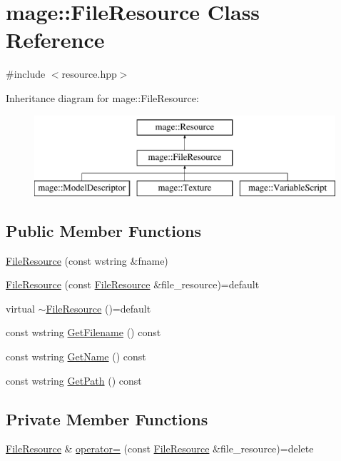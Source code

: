 \hypertarget{classmage_1_1_file_resource}{}\section{mage\+:\+:File\+Resource Class Reference}
\label{classmage_1_1_file_resource}


{\ttfamily \#include $<$resource.\+hpp$>$}

Inheritance diagram for mage\+:\+:File\+Resource\+:\begin{figure}[H]
\begin{center}
\leavevmode
\includegraphics[height=3.000000cm]{classmage_1_1_file_resource}
\end{center}
\end{figure}
\subsection*{Public Member Functions}
\begin{DoxyCompactItemize}
\item 
\hyperlink{classmage_1_1_file_resource_ab126d9301d81c55b2aaacff86437e2d4}{File\+Resource} (const wstring \&fname)
\item 
\hyperlink{classmage_1_1_file_resource_a59d2da1beaff989a3a351e60986f559d}{File\+Resource} (const \hyperlink{classmage_1_1_file_resource}{File\+Resource} \&file\+\_\+resource)=default
\item 
virtual \hyperlink{classmage_1_1_file_resource_a91ed639ff33311ebdfb54c80be7d6f62}{$\sim$\+File\+Resource} ()=default
\item 
const wstring \hyperlink{classmage_1_1_file_resource_acdd02b3c226777fd003d8f56e0a5cc83}{Get\+Filename} () const
\item 
const wstring \hyperlink{classmage_1_1_file_resource_a8bc3308e018b352157bbcfe3a85519f9}{Get\+Name} () const
\item 
const wstring \hyperlink{classmage_1_1_file_resource_a6dd2da5d50dbe8b3ac4189cdaa5fc325}{Get\+Path} () const
\end{DoxyCompactItemize}
\subsection*{Private Member Functions}
\begin{DoxyCompactItemize}
\item 
\hyperlink{classmage_1_1_file_resource}{File\+Resource} \& \hyperlink{classmage_1_1_file_resource_a195da42fa3a40991e7c38cf8305b0bf2}{operator=} (const \hyperlink{classmage_1_1_file_resource}{File\+Resource} \&file\+\_\+resource)=delete
\end{DoxyCompactItemize}


